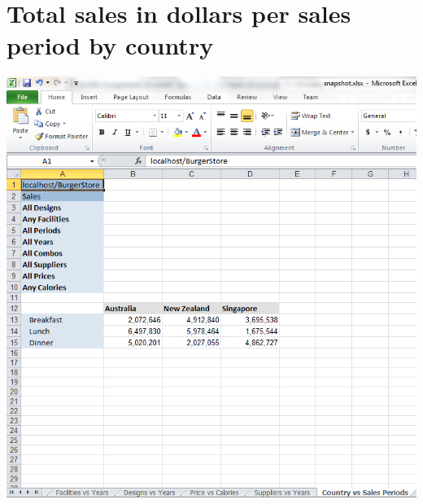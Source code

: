 \documentclass[12pt, a4paper]{article}
\begin{document}
\section{Total sales in dollars per sales period by country}
\includegraphics{diagrams/CountryVsSalesPeriod}
\end{document}
